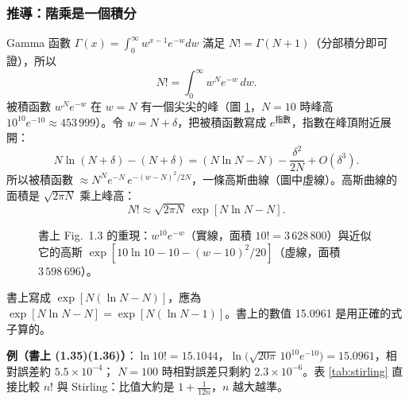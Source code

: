 \subsubsection*{推導：階乘是一個積分 }
Gamma 函數 $\Gamma(x)=\int_0^\infty w^{x-1}e^{-w}dw$ 滿足 $N!=\Gamma(N+1)$（分部積分即可證），所以
\begin{equation}
N!=\int_0^\infty w^Ne^{-w}\,dw. \tag{1.29--1.31}
\end{equation}
被積函數 $w^Ne^{-w}$ 在 $w=N$ 有一個尖尖的峰（圖 \ref{fig:gamma}，$N=10$ 時峰高 $10^{10}e^{-10}\approx453\,999$）。令 $w=N+\delta$，把被積函數寫成 $e^{\text{指數}}$，指數在峰頂附近展開：
\begin{equation}
N\ln(N+\delta)-(N+\delta)=(N\ln N-N)-\frac{\delta^2}{2N}+O(\delta^3). \tag{1.33}
\end{equation}
所以被積函數 $\approx N^Ne^{-N}\,e^{-(w-N)^2/2N}$，一條高斯曲線（圖中虛線）。高斯曲線的面積是 $\sqrt{2\pi N}$ 乘上峰高：
\begin{equation}
N!\approx\sqrt{2\pi N}\,\exp\left[N\ln N-N\right]. \tag{1.34}
\end{equation}

\begin{figure}[H]
\centering
\FigGamma
\caption{書上 Fig.~1.3 的重現：$w^{10}e^{-w}$（實線，面積 $10!=3\,628\,800$）與近似它的高斯 $\exp[10\ln10-10-(w-10)^2/20]$（虛線，面積 $3\,598\,696$）。}
\label{fig:gamma}
\end{figure}

\begin{errbox}[p.~11，(1.34)(1.36)]
書上寫成 $\exp[N(\ln N-N)]$，應為 $\exp[N\ln N-N]=\exp[N(\ln N-1)]$。書上的數值 15.0961 是用正確的式子算的。
\end{errbox}

\textbf{例（書上 (1.35)(1.36)）}：$\ln10!=15.1044$，$\ln\big(\sqrt{20\pi}\,10^{10}e^{-10}\big)=15.0961$，相對誤差約 $5.5\times10^{-4}$；
$N=100$ 時相對誤差只剩約 $2.3\times10^{-6}$。表 \ref{tab:stirling} 直接比較 $n!$ 與 Stirling：比值大約是 $1+\frac1{12n}$，$n$ 越大越準。

\begin{table}[H]
\centering
\small
\TabStirling
\caption{$n!$ 與 Stirling 公式。}
\label{tab:stirling}
\end{table}

